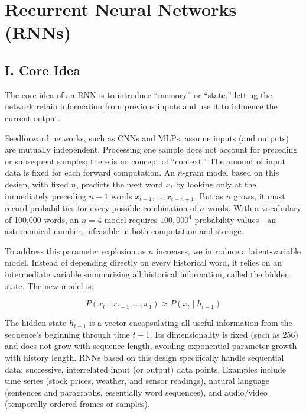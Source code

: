 \setcounter{section}{1}

\hypertarget{recurrent-neural-networks-rnns}{%
\section{Recurrent Neural Networks (RNNs)}\label{recurrent-neural-networks-rnns}}

\hypertarget{i.-core-idea-1}{%
\subsection{I. Core Idea}\label{i.-core-idea-1}}

The core idea of an RNN is to introduce ``memory'' or ``state,'' letting the network retain information from previous inputs and use it to influence the current output.

Feedforward networks, such as CNNs and MLPs, assume inputs (and outputs) are mutually independent. Processing one sample does not account for preceding or subsequent samples; there is no concept of ``context.'' The amount of input data is fixed for each forward computation. An \(n\)-gram model based on this design, with fixed \(n\), predicts the next word \(x_t\) by looking only at the immediately preceding \(n-1\) words \(x_{t-1},\ldots,x_{t-n+1}\). But as \(n\) grows, it must record probabilities for every possible combination of \(n\) words. With a vocabulary of 100,000 words, an \(n=4\) model requires \(100{,}000^4\) probability values---an astronomical number, infeasible in both computation and storage.

To address this parameter explosion as \(n\) increases, we introduce a latent-variable model. Instead of depending directly on every historical word, it relies on an intermediate variable summarizing all historical information, called the hidden state. The new model is:

\[
P(x_t \mid x_{t-1},\ldots,x_1) \approx P(x_t \mid h_{t-1})
\]

The hidden state \(h_{t-1}\) is a vector encapsulating all useful information from the sequence's beginning through time \(t-1\). Its dimensionality is fixed (such as 256) and does not grow with sequence length, avoiding exponential parameter growth with history length. RNNs based on this design specifically handle sequential data: successive, interrelated input (or output) data points. Examples include time series (stock prices, weather, and sensor readings), natural language (sentences and paragraphs, essentially word sequences), and audio/video (temporally ordered frames or samples).

